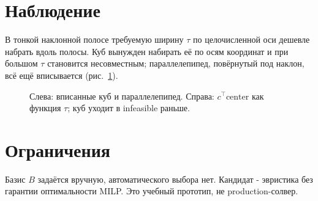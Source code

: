 \documentclass[11pt]{article}
\begin{document}
\section{Наблюдение}

В тонкой наклонной полосе требуемую ширину $\tau$ по целочисленной оси дешевле
набрать вдоль полосы. Куб вынужден набирать её по осям координат и при большом
$\tau$ становится несовместным; параллелепипед, повёрнутый под наклон, всё ещё
вписывается (рис.~\ref{fig:cmp}).

\begin{figure}[h]
\centering
\caption{Слева: вписанные куб и параллелепипед. Справа: $c^\top\mathrm{center}$
как функция $\tau$; куб уходит в infeasible раньше.}
\label{fig:cmp}
\end{figure}

\section{Ограничения}

Базис $B$ задаётся вручную, автоматического выбора нет. Кандидат - эвристика без
гарантии оптимальности MILP. Это учебный прототип, не production-солвер.
\end{document}
